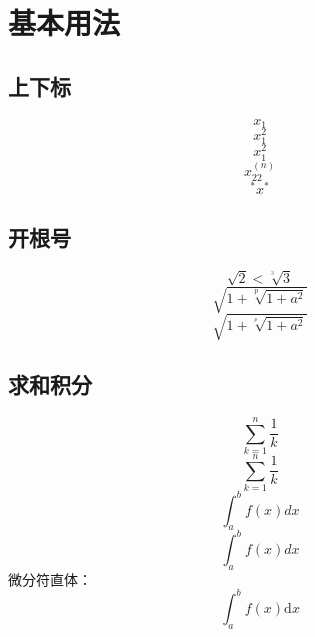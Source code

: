 \documentclass{article}
\begin{document}
\pagestyle{empty}

\section{基本用法}

\subsection{上下标}
$$x_1$$
$$x_1^2$$
$$x^2_1$$
$$x_{22}^{(n)}$$
$${}^*\!x^*$$    %

\subsection{开根号}
$$\sqrt{2}<\sqrt[^3\!]{3}$$
$$\sqrt{1+\sqrt[p]{1+a^2}}$$
$$\sqrt{1+\sqrt[^p\!]{1+a^2}}$$

\subsection{求和积分}
$$\sum_{k=1}^{n}\frac{1}{k}$$
$$\sum_{k=1}^n\frac{1}{k}$$
$$\int_a^b f(x)dx$$
$$\int_a^b f(x)dx$$
微分符直体：
$$\int_a^b f(x)\mathrm{d}x$$
\end{document}
